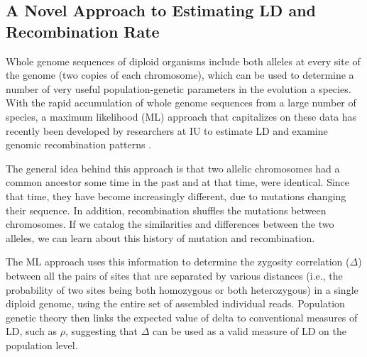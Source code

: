 \documentclass{sig-alternate}
\begin{document}
\subsection{ A Novel Approach to Estimating LD and Recombination Rate}\label{sec:migration}
Whole genome sequences of diploid organisms include both alleles at every site of the genome (two copies of
each chromosome), which can be used to determine a number of very useful population-genetic parameters in the
evolution a species. With the rapid accumulation of whole genome sequences from a large number of species, a
maximum likelihood (ML) approach that capitalizes on these data has recently been developed by researchers at
IU to estimate LD and examine genomic recombination patterns \cite{Lynch01112008,MEC:MEC4482}.

The general idea behind this approach is that two allelic chromosomes had a common ancestor some time in the
past and at that time, were
identical. Since that time, they have become 
increasingly different, due to mutations changing their sequence. In 
addition, recombination shuffles the mutations between chromosomes. If we catalog the similarities and
differences between the two alleles, we can learn about this history of mutation and recombination.

The ML approach uses this information to determine the zygosity correlation ($\Delta$) between all the pairs
of sites that are separated by various distances (i.e., the probability of two sites being both homozygous or
both heterozygous) in a single diploid genome, using the entire set of assembled individual reads. Population genetic
theory then links the expected value of delta to conventional measures of LD, such as $\rho$, suggesting
that $\Delta$ can be used as a valid measure of LD on the population level.



\end{document}
